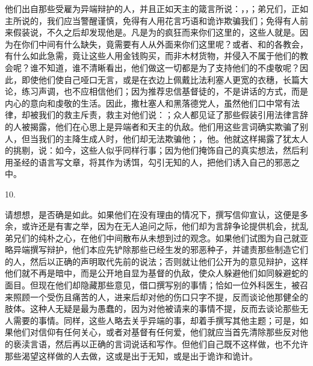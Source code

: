 他们出自那些受雇为异端辩护的人，并且正如天主的箴言所说：，，；弟兄们，正如主所说的，我们应当警醒谨慎，免得有人用花言巧语和诡诈欺骗我们；免得有人前来假装说，不久之后却发现他是。凡是为的疯狂而来你们这里的，这些人就是。因为在你们中间有什么缺失，竟需要有人从外面来你们这里呢？或者、和的各教会，有什么如此急需，竟让这些人用金钱购买，而非木材货物，并侵入不属于他们的教会呢？谁不知道，谁不清晰看出，他们做这一切都是为了支持他们的不虔敬呢？因此，即使他们使自己哑口无言，或是在衣边上佩戴比法利塞人更宽的衣穗，长篇大论，练习声调，也不应相信他们；因为推荐忠信基督徒的，不是讲话的方式，而是内心的意向和虔敬的生活。因此，撒杜塞人和黑落德党人，虽然他们口中常有法律，却被我们的救主斥责，救主对他们说：；众人都见证了那些假装引用法律言辞的人被揭露，他们在心思上是异端者和天主的仇敌。他们用这些言词确实欺骗了别人，但当我们的主降生成人时，他们却无法欺骗他；，他。他就这样揭露了犹太人的挑剔，说：如今，这些人似乎同样行事；因为他们掩饰自己的真实想法，然后利用圣经的语言写文章，将其作为诱饵，勾引无知的人，把他们诱入自己的邪恶之中。\par

10. \par

请想想，是否确是如此。如果他们在没有理由的情况下，撰写信仰宣认，这便是多余，或许还是有害之举，因为在无人追问之际，他们却为言辞争论提供机会，扰乱弟兄们的纯朴之心，在他们中间散布从未想到过的观念。如果他们试图为自己就亚略异端撰写辩护，他们本应先铲除那些已经生发的邪恶种子，并谴责那些制造它们的人，然后以正确的声明取代先前的说法；否则就让他们公开为的意见辩护，这样他们就不再是暗中，而是公开地自显为基督的仇敌，使众人躲避他们如同躲避蛇的面目。但现在他们却隐藏那些意见，借口撰写别的事情；恰如一位外科医生，被召来照顾一个受伤且痛苦的人，进来后却对他的伤口只字不提，反而谈论他那健全的肢体。这种人无疑是最为愚蠢的，因为对他被请来的事情不提，反而去谈论那些无人需要的事情。同样，这些人略去关乎异端的事，却着手撰写其他主题；可是，如果他们对信仰有任何关心，或者对基督有任何爱，他们就应当首先清除那些反对他的亵渎言语，然后再以正确的言词说话和写作。但他们自己既不这样做，也不允许那些渴望这样做的人去做，这或是出于无知，或是出于诡诈和诡计。\par

